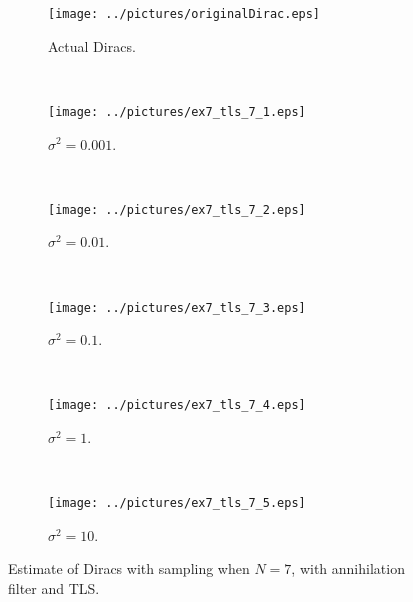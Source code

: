 \documentclass[11pt,a4paper]{report}
\begin{document}
\begin{figure}[H]
    \captionsetup[subfigure]{position=b}
    \centering
    \begin{subfigure}{0.49\textwidth}
        \texttt{[image: ../pictures/originalDirac.eps]}
        \caption{Actual Diracs.}
        \label{fig:ex7_tls_7_0}
    \end{subfigure}
    ~
    \begin{subfigure}{0.49\textwidth}
        \texttt{[image: ../pictures/ex7\_tls\_7\_1.eps]}
        \caption{$\sigma^2 = 0.001$.}
        \label{fig:ex7_tls_7_1}
    \end{subfigure}
    \\
    \begin{subfigure}{0.49\textwidth}
        \texttt{[image: ../pictures/ex7\_tls\_7\_2.eps]}
        \caption{$\sigma^2 = 0.01$.}
        \label{fig:ex7_tls_7_2}
    \end{subfigure}
    ~
    \begin{subfigure}{0.49\textwidth}
        \texttt{[image: ../pictures/ex7\_tls\_7\_3.eps]}
        \caption{$\sigma^2 = 0.1$.}
        \label{fig:ex7_tls_7_3}
    \end{subfigure}
    \\
    \begin{subfigure}{0.49\textwidth}
        \texttt{[image: ../pictures/ex7\_tls\_7\_4.eps]}
        \caption{$\sigma^2 = 1$.}
        \label{fig:ex7_tls_7_4}
    \end{subfigure}
    ~
    \begin{subfigure}{0.49\textwidth}
        \texttt{[image: ../pictures/ex7\_tls\_7\_5.eps]}
        \caption{$\sigma^2 = 10$.}
        \label{fig:ex7_tls_7_5}
    \end{subfigure}

    \caption{Estimate of Diracs with sampling when $N = 7$, with annihilation filter and TLS.}
    \label{fig:ex7_tls_7}
\end{figure}
\end{document}
